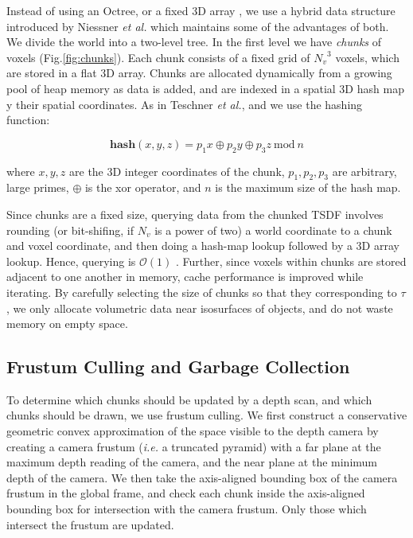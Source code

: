 \documentclass[conference]{IEEEtran}
\newcommand{\figref}[1]{Fig.\ref{#1}}
\newcommand{\etal}{\textit{et al.}}
\begin{document}
Instead of using an Octree, or a fixed 3D array , we use a hybrid data
structure introduced by Niessner \etal \cite{NiessnerHashing} which maintains
some of the advantages of both. We divide the world into a two-level tree. In
the first level we have \emph{chunks} of voxels (\figref{fig:chunks}). Each
chunk consists of a fixed grid of ${N_v}^3$ voxels, which are stored in a flat
3D array. Chunks are allocated dynamically from a growing pool of heap memory
as data is added, and are indexed in a spatial 3D hash map \cite{SpatialHashing}
y their spatial coordinates. As in Teschner \etal \cite{SpatialHashing}, and
\cite{NiessnerHashing} we use the hashing function:

\begin{equation}
\textbf{hash}(x, y, z) = p_1 x\oplus p_2 y \oplus p_3 z
~\text{mod}~n
\end{equation}

\noindent where $x, y, z$ are the 3D integer coordinates of the chunk, $p_1,
p_2, p_3$ are arbitrary, large primes, $\oplus$ is the xor operator, and $n$ is
the maximum size of the hash map.

Since chunks are a fixed size, querying data from the chunked TSDF involves
rounding (or bit-shifing, if $N_v$ is a power of two) a world coordinate to a
chunk and voxel coordinate, and then doing a hash-map lookup followed by a 3D
array lookup. Hence, querying is $\mathcal{O}(1)$ \cite{NiessnerHashing}.
Further, since voxels within chunks are stored adjacent to one another in
memory, cache performance is improved while iterating. By carefully selecting
the size of chunks so that they corresponding to $\tau$, we only allocate
volumetric data near isosurfaces of objects, and do not waste memory on empty space.

\subsection{Frustum Culling and Garbage Collection}
\label{section:frustum}
To determine which chunks should be updated by a depth scan, and which chunks
should be drawn, we use frustum culling. We first construct a conservative
geometric convex approximation of the space visible to the depth camera by
creating a camera frustum (\textit{i.e.} a truncated pyramid) with a far plane
at the maximum depth reading of the camera, and the near plane at the minimum
depth of the camera. We then take the axis-aligned bounding box of the camera
frustum in the global frame, and check each chunk inside the axis-aligned
bounding box for intersection with the camera frustum. Only those which
intersect the frustum are updated. 
\end{document}
